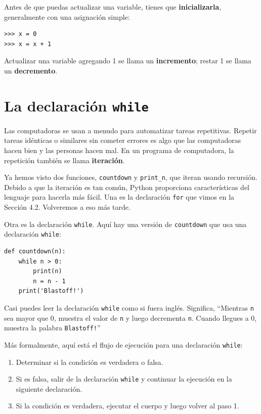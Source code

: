 Antes de que puedas actualizar una variable, tienes que \textbf{inicializarla}, generalmente con una asignación simple:

\begin{lstlisting}
>>> x = 0
>>> x = x + 1
\end{lstlisting}

Actualizar una variable agregando 1 se llama un \textbf{incremento}; restar 1 se llama un \textbf{decremento}.

\section{La declaración \texttt{while}}

Las computadoras se usan a menudo para automatizar tareas repetitivas. Repetir tareas idénticas o similares sin cometer errores es algo que las computadoras hacen bien y las personas hacen mal. En un programa de computadora, la repetición también se llama \textbf{iteración}.

Ya hemos visto dos funciones, \texttt{countdown} y \texttt{print\_n}, que iteran usando recursión. Debido a que la iteración es tan común, Python proporciona características del lenguaje para hacerla más fácil. Una es la declaración \texttt{for} que vimos en la Sección 4.2. Volveremos a eso más tarde.

Otra es la declaración \texttt{while}. Aquí hay una versión de \texttt{countdown} que usa una declaración \texttt{while}:

\begin{lstlisting}
def countdown(n):
    while n > 0:
        print(n)
        n = n - 1
    print('Blastoff!')
\end{lstlisting}

Casi puedes leer la declaración \texttt{while} como si fuera inglés. Significa, ``Mientras \texttt{n} sea mayor que 0, muestra el valor de \texttt{n} y luego decrementa \texttt{n}. Cuando llegues a 0, muestra la palabra \texttt{Blastoff!}''

Más formalmente, aquí está el flujo de ejecución para una declaración \texttt{while}:

\begin{enumerate}
\item Determinar si la condición es verdadera o falsa.
\item Si es falsa, salir de la declaración \texttt{while} y continuar la ejecución en la siguiente declaración.
\item Si la condición es verdadera, ejecutar el cuerpo y luego volver al paso 1.
\end{enumerate}

